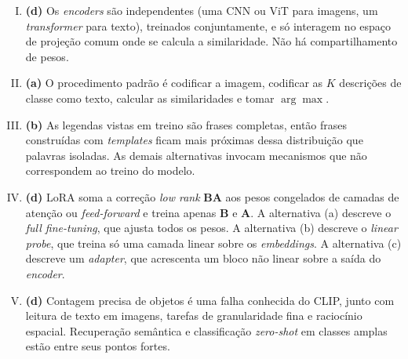 \documentclass{dlproblemset}
\begin{document}
\begin{enumerate}[I)]
    \item \textbf{(d)} Os \textit{encoders} são independentes (uma CNN ou ViT para imagens, um \textit{transformer} para texto), treinados conjuntamente, e só interagem no espaço de projeção comum onde se calcula a similaridade. Não há compartilhamento de pesos.

    \item \textbf{(a)} O procedimento padrão é codificar a imagem, codificar as $K$ descrições de classe como texto, calcular as similaridades e tomar $\arg\max$.

    \item \textbf{(b)} As legendas vistas em treino são frases completas, então frases construídas com \textit{templates} ficam mais próximas dessa distribuição que palavras isoladas. As demais alternativas invocam mecanismos que não correspondem ao treino do modelo.

    \item \textbf{(d)} LoRA soma a correção \textit{low rank} $\mathbf{B}\mathbf{A}$ aos pesos congelados de camadas de atenção ou \textit{feed-forward} e treina apenas $\mathbf{B}$ e $\mathbf{A}$. A alternativa (a) descreve o \textit{full fine-tuning}, que ajusta todos os pesos. A alternativa (b) descreve o \textit{linear probe}, que treina só uma camada linear sobre os \textit{embeddings}. A alternativa (c) descreve um \textit{adapter}, que acrescenta um bloco não linear sobre a saída do \textit{encoder}.

    \item \textbf{(d)} Contagem precisa de objetos é uma falha conhecida do CLIP, junto com leitura de texto em imagens, tarefas de granularidade fina e raciocínio espacial. Recuperação semântica e classificação \textit{zero-shot} em classes amplas estão entre seus pontos fortes.
\end{enumerate}
\end{document}
